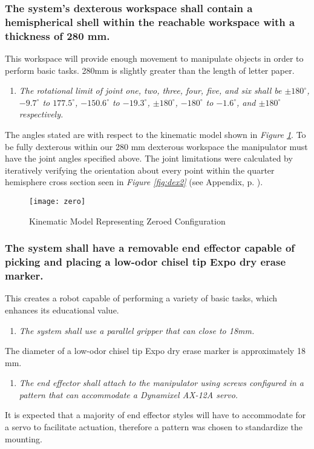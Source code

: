 \subsubsection{The system’s dexterous workspace shall contain a hemispherical shell within the reachable workspace with a thickness of 280 mm.}\label{sec:zero}
This workspace will provide enough movement to manipulate objects in order to perform basic tasks. 280mm is slightly greater than the length of letter paper.
\begin{enumerate}
  \item \textit{The rotational limit of joint one, two, three, four, five, and six shall be \(\pm180^{\circ}\), \(-9.7^{\circ}\) to \(177.5^{\circ}\), \(-150.6^{\circ}\) to \(-19.3^{\circ}\), \(\pm180^{\circ}\), \(-180^{\circ}\) to \(-1.6^{\circ}\), and \(\pm180^{\circ}\) respectively.}
\end{enumerate}
The angles stated are with respect to the kinematic model shown in \emph{Figure \ref{fig:zero}}. To be fully dexterous within our 280 mm dexterous workspace the manipulator must have the joint angles specified above. The joint limitations were calculated by iteratively verifying the orientation about every point within the quarter hemisphere cross section seen in \emph{Figure \ref{fig:dex2}} (see Appendix, p. \pageref{sec:app}).
  \begin{figure}[htp]
    \centering
    \texttt{[image: zero]}
    \caption[Kinematic Model Representing Zeroed Configuration]{Kinematic Model Representing Zeroed Configuration \cite{robo}}
    \label{fig:zero}
  \end{figure}
\subsubsection{The system shall have a removable end effector capable of picking and placing a low-odor chisel tip Expo dry erase marker.}
This creates a robot capable of performing a variety of basic tasks, which enhances its educational value.
\begin{enumerate}
  \item \textit{The system shall use a parallel gripper that can close to 18mm.}
\end{enumerate}
The diameter of a low-odor chisel tip Expo dry erase marker is approximately 18 mm.
\begin{enumerate}[resume]
  \item \textit{The end effector shall attach to the manipulator using screws configured in a pattern that can accommodate a Dynamixel AX-12A servo.}
\end{enumerate}
It is expected that a majority of end effector styles will have to accommodate for a servo to facilitate actuation, therefore a pattern was chosen to standardize the mounting.


